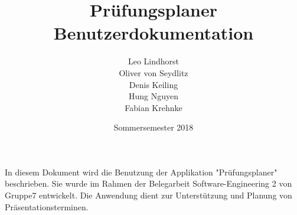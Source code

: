 \documentclass{scrartcl}
\begin{document}
	\title{Prüfungsplaner \\ Benutzerdokumentation}
	\author{Leo Lindhorst\\
		Oliver von Seydlitz\\
		Denis Keiling\\
		Hung Nguyen\\
		Fabian Krehnke}
	\date{Sommersemester 2018}
	\maketitle
	
	 In diesem Dokument wird die Benutzung der Applikation "Prüfungsplaner" beschrieben. Sie wurde im Rahmen der Belegarbeit Software-Engineering 2 von Gruppe7 entwickelt. Die Anwendung dient zur Unterstützung und Planung von Präsentationsterminen.
	
	\tableofcontents
	
	
	
\end{document}
